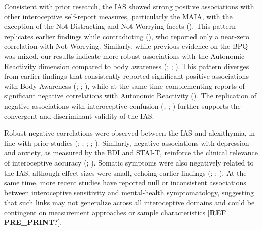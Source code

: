 \documentclass[
  jou,
  floatsintext,
  longtable,
  nolmodern,
  notxfonts,
  notimes,
  colorlinks=true,linkcolor=blue,citecolor=blue,urlcolor=blue]{apa7}
\begin{document}
Consistent with prior research, the IAS showed strong positive
associations with other interoceptive self-report measures, particularly
the MAIA, with the exception of the Not Distracting and Not Worrying
facets (). This pattern
replicates earlier findings while contradicting
(), who reported only a
near-zero correlation with Not Worrying. Similarly, while previous
evidence on the BPQ was mixed, our results indicate more robust
associations with the Autonomic Reactivity dimension compared to body
awareness (;
;
). This pattern diverges from
earlier findings that consistently reported significant positive
associations with Body Awareness (; ;
), while at the same
time complementing reports of significant negative correlations with
Autonomic Reactivity ().
The replication of negative associations with interoceptive confusion
(;
;
) further supports the
convergent and discriminant validity of the IAS.

Robust negative correlations were observed between the IAS and
alexithymia, in line with prior studies (; ;
;
;
). Similarly, negative
associations with depression and anxiety, as measured by the BDI and
STAI-T, reinforce the clinical relevance of interoceptive accuracy
(;
). Somatic symptoms were also
negatively related to the IAS, although effect sizes were small, echoing
earlier findings (;
;
). At the same time, more recent
studies have reported null or inconsistent associations between
interoceptive sensitivity and mental-health symptomatology, suggesting
that such links may not generalize across all interoceptive domains and
could be contingent on measurement approaches or sample characteristics
{[}\textbf{REF PRE\_PRINT?}{]}.
\end{document}
